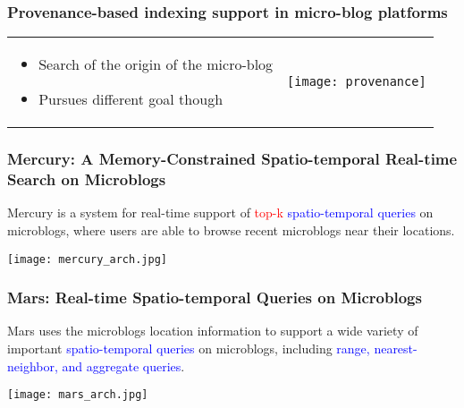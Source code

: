 \documentclass[11pt]{beamer}
\begin{document}
    
	
	\begin{frame}
		\frametitle{Provenance-based indexing support in micro-blog platforms}
        \begin{table}[h!]
             \begin{center}
               \begin{tabular}{ p{5cm}  c }
                  \begin{minipage}{5cm}
                    \begin{itemize}
                      \item Search of the origin of the micro-blog
                      \item Pursues different goal though
                    \end{itemize}
                  \end{minipage}
                  &
                  \begin{minipage}{.5\textwidth}
                    \texttt{[image: provenance]}
                  \end{minipage}
                \end{tabular}
              \end{center}
            \end{table}
	\end{frame}
	
	
	\begin{frame}
		\frametitle{Mercury: A Memory-Constrained Spatio-temporal Real-time Search on Microblogs}
		Mercury is a system for real-time support of \textcolor{red}{top-k} \textcolor{blue}{spatio-temporal queries} on microblogs, where users are able to browse recent microblogs near their locations.
		\begin{center}
			\texttt{[image: mercury\_arch.jpg]}
		\end{center}
	\end{frame}
	
	
	\begin{frame}
		\frametitle{Mars: Real-time Spatio-temporal Queries on Microblogs}
		Mars uses the microblogs location information to support a wide variety of important \textcolor{blue}{spatio-temporal queries} on microblogs, including \textcolor{blue}{range, nearest-neighbor, and aggregate queries}. 
		\begin{center}
			\texttt{[image: mars\_arch.jpg]}		
		\end{center}
	\end{frame}
\end{document}
